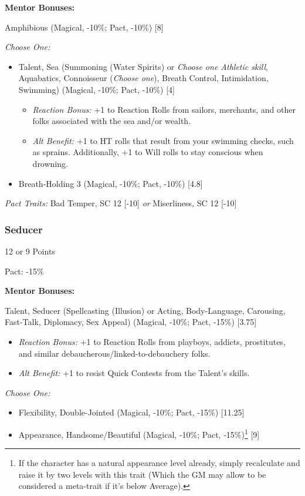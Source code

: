 \begin{multicols}{3}
	
	\textbf{Mentor Bonuses:} 
	
	Amphibious (Magical, -10\%; Pact, -10\%) [8]
	
	\textit{Choose One:}
	\begin{itemize}
		\itemsep 0pt
		\item Talent, Sea (Summoning (Water Spirits) or \textit{Choose one Athletic skill}, Aquabatics, Connoisseur (\textit{Choose one}), Breath Control, Intimidation, Swimming) (Magical, -10\%; Pact, -10\%) [4]
		\begin{itemize}
			\itemsep 0pt
			\item \textit{Reaction Bonus:} +1 to Reaction Rolls from sailors, merchants, and other folks associated with the sea and/or wealth.
			\item \textit{Alt Benefit:} +1 to HT rolls that result from your swimming checks, such as sprains. Additionally, +1 to Will rolls to stay conscious when drowning.
		\end{itemize}
		\item Breath-Holding 3 (Magical, -10\%; Pact, -10\%) [4.8]
	\end{itemize}
	
	\textit{Pact Traits:} Bad Temper, SC 12 [-10] \textit{or} Miserliness, SC 12 [-10]
	
	\subsubsection{Seducer}
	\begin{flushright}
		12 or 9 Points
	\end{flushright}
	Pact: -15\%
	
	
	\textbf{Mentor Bonuses:} 
	
	Talent, Seducer (Spellcasting (Illusion) or Acting, Body-Language, Carousing, Fast-Talk, Diplomacy, Sex Appeal) (Magical, -10\%; Pact, -15\%) [3.75]
	\begin{itemize}
		\itemsep 0pt
		\item \textit{Reaction Bonus:} +1 to Reaction Rolls from playboys, addicts, prostitutes, and similar debaucherous/linked-to-debauchery folks.
		\item \textit{Alt Benefit:} +1 to resist Quick Contests from the Talent's skills.
	\end{itemize}
	
	\textit{Choose One:}
	\begin{itemize}
		\itemsep 0pt
		\item Flexibility, Double-Jointed (Magical, -10\%; Pact, -15\%) [11.25]
		\item Appearance, Handsome/Beautiful (Magical, -10\%; Pact, -15\%)\footnote{If the character has a natural appearance level already, simply recalculate and raise it by two levels with this trait (Which the GM may allow to be considered a meta-trait if it's below Average).} [9]
	\end{itemize}


\end{multicols}

